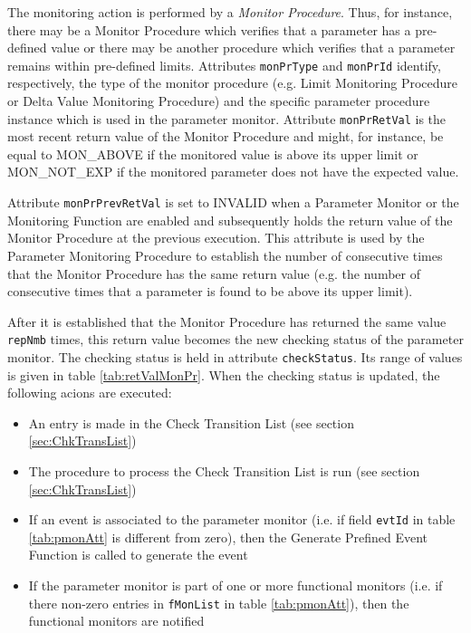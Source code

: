 \documentclass{pnp_article}
\begin{document}
The monitoring action is performed by a \textit{Monitor Procedure}. Thus, for instance, there may be a Monitor Procedure which verifies that a parameter has a pre-defined value or there may be another procedure which verifies that a parameter remains within pre-defined limits. Attributes \texttt{monPrType} and \texttt{monPrId} identify, respectively, the type of the monitor procedure (e.g. Limit Monitoring Procedure or Delta Value Monitoring Procedure) and the specific parameter procedure instance which is used in the parameter monitor. Attribute \texttt{monPrRetVal} is the most recent return value of the Monitor Procedure and might, for instance, be equal to MON\_ABOVE if the monitored value is above its upper limit or MON\_NOT\_EXP if the monitored parameter does not have the expected value.

Attribute \texttt{monPrPrevRetVal} is set to INVALID when a Parameter Monitor or the Monitoring Function are enabled and subsequently holds the return value of the Monitor Procedure at the previous execution. This attribute is used by the Parameter Monitoring Procedure to establish the number of consecutive times that the Monitor Procedure has the same return value (e.g. the number of consecutive times that a parameter is found to be above its upper limit).

After it is established that the Monitor Procedure has returned the same value \texttt{repNmb} times, this return value becomes the new checking status of the parameter monitor. The checking status is held in attribute \texttt{checkStatus}. Its range of values is given in table \ref{tab:retValMonPr}. When the checking status is updated, the following acions are executed:

\begin{itemize}
\item An entry is made in the Check Transition List (see section \ref{sec:ChkTransList})
\item The procedure to process the Check Transition List is run (see section \ref{sec:ChkTransList})
\item If an event is associated to the parameter monitor (i.e. if field \texttt{evtId} in table \ref{tab:pmonAtt} is different from zero), then the Generate Prefined Event Function is called to generate the event
\item If the parameter monitor is part of one or more functional monitors (i.e. if there non-zero entries in \texttt{fMonList} in table \ref{tab:pmonAtt}), then the functional monitors are notified
\end{itemize}
\end{document}
